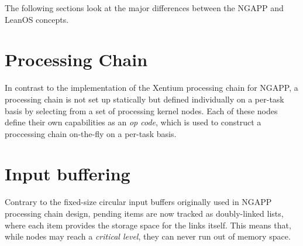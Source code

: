 The following sections look at the major differences between the NGAPP and
LeanOS concepts.

\section {Processing Chain}

In contrast to the implementation of the Xentium processing chain for
\gls{NGAPP}, a processing chain is not set up statically but defined
individually on a per-task basis by selecting from a set of processing kernel
nodes. Each of these nodes define their own capabilities as an \emph{op code},
which is used to construct a proccessing chain on-the-fly on a per-task basis.


\section {Input buffering}

Contrary to the fixed-size circular input buffers originally used in \gls{NGAPP}
processing chain design, pending items are now tracked as doubly-linked lists,
where each item provides the storage space for the links itself. This means
that, while nodes may reach a \emph{critical level}, they can never run out of
memory space.





